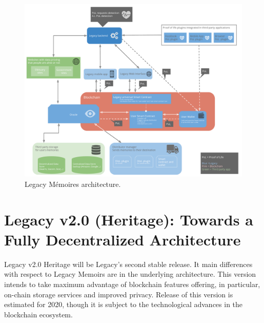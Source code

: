 \begin{figure}[h]
  \centering
  \includegraphics[scale=0.3]{fig/architecture_v02_hybrid}
  \caption{Legacy Mémoires architecture.}
  \label{fig:leg_v1_arch}
\end{figure} 


\section{Legacy v2.0 (Heritage): Towards a Fully Decentralized Architecture} %
\label{sec:legacy_v2_0_heritage_towards_a_fully_decentralized_architecture}
Legacy v2.0 Heritage will be Legacy’s second stable release. It main differences with respect to Legacy Memoirs are in the underlying architecture. This version intends to take maximum advantage of blockchain features offering, in particular, on-chain storage services and improved privacy. 
Release of this version is estimated for 2020, though it is subject to the technological advances in the blockchain ecosystem.

